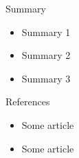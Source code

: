 \documentclass{beamer}
\begin{document}
\begin{frame}{Summary}
	\begin{itemize}
	  \item Summary 1
		\item Summary 2
		\item Summary 3
  \end{itemize}
\end{frame} 
 

\begin{frame}{References}
	\begin{itemize}
		\item Some article
		\item Some article
		
  \end{itemize} 
\end{frame}
\end{document}
